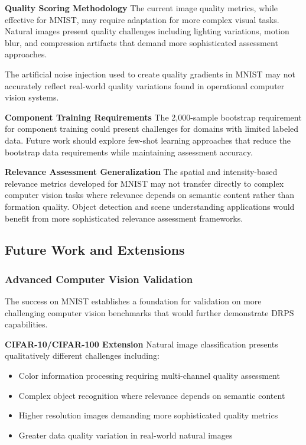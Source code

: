 \documentclass[12pt]{article}
\begin{document}
\textbf{Quality Scoring Methodology}
The current image quality metrics, while effective for MNIST, may require adaptation for more complex visual tasks. Natural images present quality challenges including lighting variations, motion blur, and compression artifacts that demand more sophisticated assessment approaches.

The artificial noise injection used to create quality gradients in MNIST may not accurately reflect real-world quality variations found in operational computer vision systems.

\textbf{Component Training Requirements}
The 2,000-sample bootstrap requirement for component training could present challenges for domains with limited labeled data. Future work should explore few-shot learning approaches that reduce the bootstrap data requirements while maintaining assessment accuracy.

\textbf{Relevance Assessment Generalization}
The spatial and intensity-based relevance metrics developed for MNIST may not transfer directly to complex computer vision tasks where relevance depends on semantic content rather than formation quality. Object detection and scene understanding applications would benefit from more sophisticated relevance assessment frameworks.

\subsection{Future Work and Extensions}\label{future-work}

\subsubsection{Advanced Computer Vision Validation}\label{advanced-cv}

The success on MNIST establishes a foundation for validation on more challenging computer vision benchmarks that would further demonstrate DRPS capabilities.

\textbf{CIFAR-10/CIFAR-100 Extension}
Natural image classification presents qualitatively different challenges including:
\begin{itemize}
\item Color information processing requiring multi-channel quality assessment
\item Complex object recognition where relevance depends on semantic content
\item Higher resolution images demanding more sophisticated quality metrics
\item Greater data quality variation in real-world natural images
\end{itemize}
\end{document}
